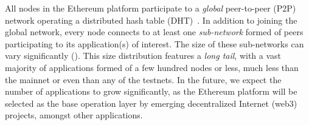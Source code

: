 All nodes in the Ethereum platform participate to a \emph{global} peer-to-peer (P2P) network operating a distributed hash table (DHT)~\cite{maymounkov2002kademlia}.
In addition to joining the global network, every node connects to at least one \emph{sub-network} formed of peers participating to its application(s) of interest.
The size of these sub-networks can vary significantly ().
This size distribution features a \emph{long tail}, with a vast majority of applications formed of a few hundred nodes or less, much less than the mainnet or even than any of the testnets.
In the future, we expect the number of applications to grow significantly, as the Ethereum platform will be selected as the base operation layer by emerging decentralized Internet (web3) projects, amongst other applications.

